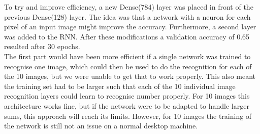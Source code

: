 \documentclass[a4paper,12pt]{article}
\begin{document}
To try and improve efficiency, a new Dense(784) layer was placed in front of the previous Dense(128) layer. The idea was that a network with a neuron for each pixel of an input image might improve the accuracy. Furthermore, a second layer was added to the RNN. After these modifications a validation accuracy of 0.65 resulted after 30 epochs.\\

The first part would have been more efficient if a single network was trained to recognise one image, which could then be used to do the recognition for each of the 10 images, but we were unable to get that to work properly. This also meant the training set had to be larger such that each of the 10 individual image recognition layers could learn to recognise number properly. For 10 images this architecture works fine, but if the network were to be adapted to handle larger sums, this approach will reach its limits. However, for 10 images the training of the network is still not an issue on a normal desktop machine.
\end{document}
